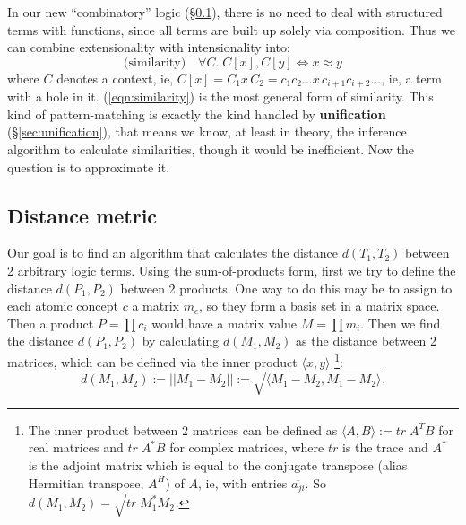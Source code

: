 In our new ``combinatory'' logic (\S\ref{}), there is no need to deal with structured terms with functions, since all terms are built up solely via composition.  Thus we can combine extensionality with intensionality into:
\begin{equation}
\mbox{(similarity)} \quad \forall C. \; C[ x ] , C[ y ] \Leftrightarrow  x \approx y 
\label{eqn:similarity}
\end{equation}
where $C$ denotes a context, ie, $C[x] = C_1 x \, C_2 = c_1 c_2 ... x \, c_{i+1} c_{i+2} ... $, ie, a term with a hole in it.  (\ref{eqn:similarity}) is the most general form of similarity.  This kind of pattern-matching is exactly the kind handled by \textbf{unification} (\S\ref{sec:unification}), that means we know, at least in theory, the inference algorithm to calculate similarities, though it would be inefficient.  Now the question is to approximate it.


\subsection{Distance metric}

Our goal is to find an algorithm that calculates the distance $d(T_1, T_2)$ between 2 arbitrary logic terms.  Using the sum-of-products form, first we try to define the distance $d(P_1, P_2)$ between 2 products.  One way to do this may be to assign to each atomic concept $c$ a matrix $m_c$, so they form a basis set in a matrix space.  Then a product $P = \prod c_i$ would have a matrix value $M = \prod m_i$.  Then we find the distance $d(P_1, P_2)$ by calculating $d(M_1, M_2)$ as the distance between 2 matrices, which can be defined via the inner product $\langle x,y \rangle$ \footnote{The inner product between 2 matrices can be defined as $\langle A, B \rangle  := tr \; A^T B$ for real matrices and $tr \; A^*B$ for complex matrices, where $tr$ is the trace and $A^*$ is the adjoint matrix which is equal to the conjugate transpose (alias Hermitian transpose, $A^H$) of $A$, ie, with entries $\overline{a_{ji}}$.  So $ d(M_1, M_2) =  \sqrt{tr \; M_1 ^* M_2} $.}:
$$ d(M_1, M_2) := || M_1 - M_2 || := \sqrt{\langle M_1 - M_2, M_1 - M_2 \rangle} .$$

